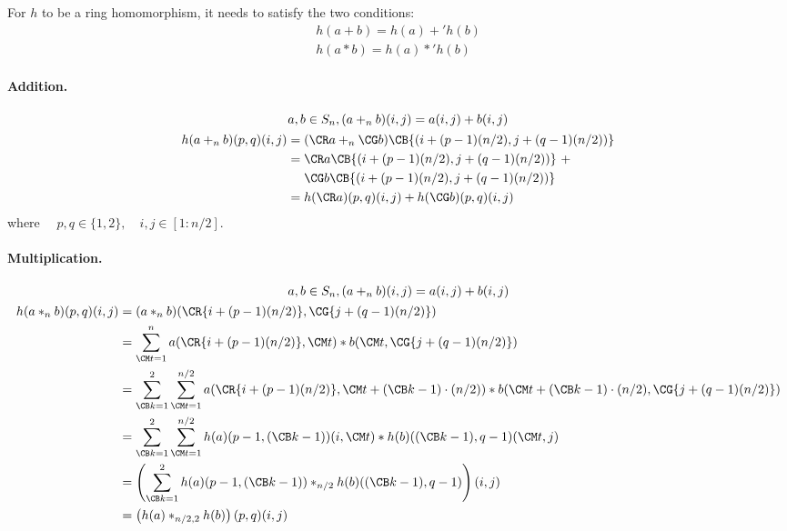 For \(h\) to be a ring homomorphism, it needs to satisfy the two conditions:
\begin{gather*}
    h(a + b) = h(a) +' h(b) \\
    h(a * b) = h(a) *' h(b)
\end{gather*}

\paragraph{Addition.}
\begin{displaymath}
    \begin{gathered} 
        a, b \in S_n,
        (a +_n b)(i, j) = a(i, j) + b(i, j) \\
        \begin{aligned}
            h(a +_n b)(p, q)(i, j)
            =\phantom{}& (\CR a +_n \CG b)\CB{(i + (p - 1)(n / 2), j + (q - 1)(n / 2))} \\
            =\phantom{}& \CR a\CB{(i + (p - 1)(n / 2), j + (q - 1)(n / 2))}\ + \\
             & \CG b\CB{(i + (p - 1)(n / 2), j + (q - 1)(n / 2))} \\
            =\phantom{}& h(\CR a)(p, q)(i, j) + h(\CG b)(p, q)(i, j)
        \end{aligned}
    \end{gathered}
\end{displaymath}
where \(\quad p, q \in \{1, 2\}, \quad i, j \in [1:n/2]\).

\paragraph{Multiplication.}
\begin{displaymath}
    \begin{gathered}
        a, b \in S_n,
        (a +_n b)(i, j) = a(i, j) + b(i, j) \\
        \begin{aligned}
            h(a *_n b)(p, q)(i, j)
            &= (a *_n b)(\CR{i + (p - 1)(n / 2)}, \CG{j + (q - 1)(n / 2)}) \\
            &= \sum_{\CM t = 1}^{n} a(\CR{i + (p - 1)(n / 2)}, \CM t) * b(\CM t, \CG{j + (q - 1)(n / 2)}) \\
            &= \sum_{\CB k = 1}^{2} \sum_{\CM t = 1}^{n / 2} a(\CR{i + (p - 1)(n / 2)}, \CM t + (\CB k - 1) \cdot (n / 2)) * b(\CM t + (\CB k - 1) \cdot (n / 2), \CG{j + (q - 1)(n / 2)}) \\
            &= \sum_{\CB k = 1}^{2} \sum_{\CM t = 1}^{n / 2} h(a)(p-1, (\CB k - 1))(i, \CM t) * h(b)((\CB k - 1), q-1)(\CM t, j) \\
            &= \left(\sum_{\CB k = 1}^{2} h(a)(p-1, (\CB k - 1)) *_{n/2} h(b)((\CB k - 1), q-1)\right)(i, j) \\
            &= \left(h(a) *_{n/2, 2} h(b)\right)(p, q)(i, j) \\
        \end{aligned}
    \end{gathered}
\end{displaymath}

